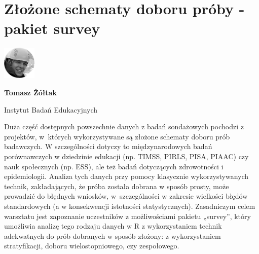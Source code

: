 \documentclass[\main/boa.tex]{subfiles}
\begin{document}
\section{Złożone schematy doboru próby - pakiet survey}
\begin{minipage}[t]{0.915\textwidth}
	\center     
    \includegraphics[width=60px]{img/workshops/czarno_biale/zoltak.png} 
\end{minipage}

\begin{minipage}{0.915\textwidth}
\centering
{\bf {} Tomasz Żółtak}
\end{minipage}

\vskip 0.3cm

\begin{affiliations}
\begin{minipage}{0.915\textwidth}
\centering
\large Instytut Badań Edukacyjnych  \\[2pt]
\end{minipage}
\end{affiliations}

\vskip 0.8cm

\opiswarsztatu Duża część dostępnych powszechnie danych z badań sondażowych pochodzi z projektów, w~których wykorzystywane są złożone schematy doboru prób badawczych. W szczególności dotyczy to międzynarodowych badań porównawczych w dziedzinie edukacji (np. TIMSS, PIRLS, PISA, PIAAC) czy nauk społecznych (np. ESS), ale też badań dotyczących zdrowotności i epidemiologii. Analiza tych danych przy pomocy klasycznie wykorzystywanych technik, zakładających, że próba została dobrana w sposób prosty, może prowadzić do błędnych wniosków, w~szczególności w zakresie wielkości błędów standardowych (a w konsekwencji istotności statystycznych). Zasadniczym celem warsztatu jest zapoznanie uczestników z możliwościami pakietu „survey”, który umożliwia analizę tego rodzaju danych w R z wykorzystaniem technik adekwatnych do prób dobranych w sposób złożony: z wykorzystaniem stratyfikacji, doboru wielostopniowego, czy zespołowego.
\end{document}
